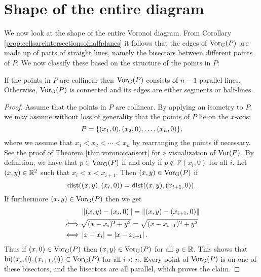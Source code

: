 \section{Shape of the entire diagram}
We now look at the shape of the entire Voronoi diagram. From Corollary \ref{prop:cellsareintersectionsofhalfplanes} it follows that the edges of $\operatorname{Vor_{G}}(P)$ are made up of parts of straight lines, namely the bisectors between different points of $P$. We now classify these based on the structure of the points in $P$:
\begin{thm} \label{prop:structureofentirevoronoidiagram}
If the points in $P$ are collinear then $\operatorname{Vor_{G}}(P)$ consists of $n - 1$ parallel lines. Otherwise, $\operatorname{Vor_{G}}(P)$ is connected and its edges are either segments or half-lines.
\end{thm}
\begin{proof}
Assume that the points in $P$ are collinear. By applying an isometry to $P$, we may assume without loss of generality that the points of $P$ lie on the $x$-axis:
\[
    P = \{(x_1, 0), (x_2, 0), \ldots, (x_n, 0)\},
\]
where we assume that $x_1 < x_2 < \cdots < x_n$ by rearranging the points if necessary. See the proof of Theorem \ref{thm:voronoicansort} for a visualization of $\operatorname{Vor}(P)$. By definition, we have that $p \in \operatorname{Vor_{G}}(P)$ if and only if $p \not\in \mathcal{V}(x_i, 0)$ for all $i$. Let $(x, y) \in \mathbb{R}^2$ such that $x_i < x < x_{i+1}$. Then $(x, y) \in \operatorname{Vor_{G}}(P)$ if
\[
    \operatorname{dist}((x, y), (x_i, 0)) = \operatorname{dist}((x, y), (x_{i+1}, 0)).
\]
If furthermore $(x, y) \in \operatorname{Vor_{G}}(P)$ then we get
\begin{align*}
    &\left\lVert (x, y) - (x_i, 0) \right\rVert = \left\lVert (x, y) - (x_{i+1}, 0) \right\rVert \\
    \iff &\sqrt{(x - x_i)^2 + y^2} = \sqrt{(x - x_{i+1})^2 + y^2} \\
    \iff &\left\lvert x - x_i \right\rvert = \left\lvert x - x_{i+1} \right\rvert.
\end{align*}
Thus if $(x, 0) \in \operatorname{Vor_{G}}(P)$ then $(x, y) \in \operatorname{Vor_{G}}(P)$ for all $y \in \mathbb{R}$. This shows that $\operatorname{bi}((x_i, 0), (x_{i+1}, 0)) \subset \operatorname{Vor_{G}}(P)$ for all $i < n$. Every point of $\operatorname{Vor_{G}}(P)$ is on one of these bisectors, and the bisectors are all parallel, which proves the claim. 


\end{proof}
